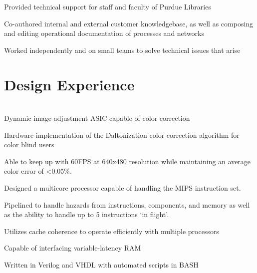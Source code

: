 \documentclass[letterpaper]{deedy-resume} %
\begin{document}
\begin{minipage}[t]{0.66\textwidth}
\sectionsep %





\begin{tightemize}
\item Provided technical support for staff and faculty of Purdue Libraries
\item Co-authored internal and external customer knowledgebase, as well as composing and editing operational documentation of processes and networks
\item Worked independently and on small teams to solve technical issues that arise
\end{tightemize}





\section{Design Experience}

 \\
Dynamic image-adjustment ASIC capable of color correction
\begin{tightemize}
\item Hardware implementation of the Daltonization color-correction algorithm for color blind users
\item Able to keep up with 60FPS at 640x480 resolution while maintaining an average color error of <0.05\%.
\end{tightemize}

\sectionsep %


\descript{}

Designed a multicore processor capable of handling the MIPS instruction set. 
\begin{tightemize}
\item Pipelined to handle hazards from instructions, components, and memory as well as the ability to handle up to 5 instructions ‘in flight’.
\item Utilizes cache coherence to operate efficiently with multiple processors
\item Capable of interfacing variable-latency RAM
\item Written in Verilog and VHDL with automated scripts in BASH
\end{tightemize}




\end{minipage}
\end{document}
